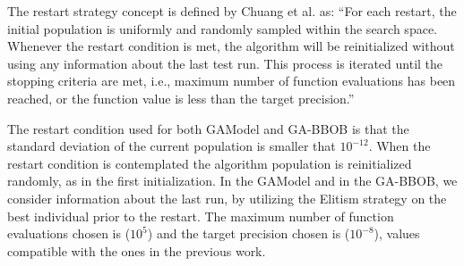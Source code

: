 The restart strategy concept is defined by Chuang et al. as: ``For each restart, the initial population  is uniformly and randomly sampled within the search space. Whenever the restart condition is met, the algorithm will be reinitialized without using any information about the last test run. This process is iterated until the stopping criteria are met, i.e., maximum number of function evaluations has been reached, or the function value is less than the target precision.''

The restart condition used for both GAModel and GA-BBOB is that the standard deviation of the current population is smaller that $10^{-12}$. When the restart condition is contemplated the algorithm population is reinitialized randomly, as in the first initialization. In the GAModel and in the GA-BBOB, we consider information about the last run, by utilizing the Elitism strategy on the best individual prior to the restart. The maximum number of function evaluations chosen is ($10^5$) and the target precision chosen is ($10^{-8}$), values compatible with the ones in the previous work.
